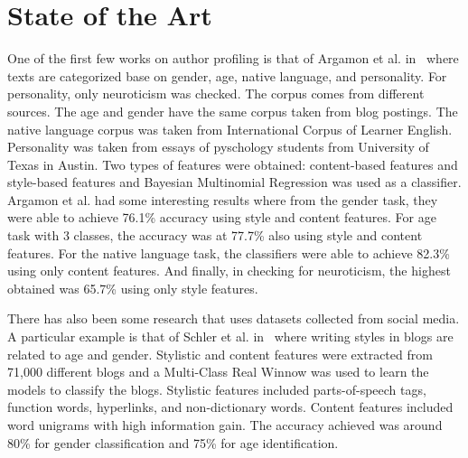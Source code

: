 \documentclass[a4paper]{llncs}
\begin{document}
\section{State of the Art}
One of the first few works on author profiling is that of Argamon et al. in~\cite{argamon2009automatically} where texts are categorized base on gender, age, native language, and personality. For personality, only neuroticism was checked. The corpus comes from different sources. The age and gender have the same corpus taken from blog postings. The native language corpus was taken from International Corpus of Learner English. Personality was taken from essays of pyschology students from University of Texas in Austin. Two types of features were obtained: content-based features and style-based features and Bayesian Multinomial Regression was used as a classifier. Argamon et al. had some interesting results where from the gender task, they were able to achieve 76.1\% accuracy using style and content features. For age task with 3 classes, the accuracy was at 77.7\% also using style and content features. For the native language task, the classifiers were able to achieve 82.3\% using only content features. And finally, in checking for neuroticism, the highest obtained was 65.7\% using only style features. 

There has also been some research that uses datasets collected from social media. A particular example is that of Schler et al. in~\cite{schler2006effects} where writing styles in blogs are related to age and gender. Stylistic and content features were extracted from 71,000 different blogs and a Multi-Class Real Winnow was used to learn the models to classify the blogs. Stylistic features included parts-of-speech tags, function words, hyperlinks, and non-dictionary words. Content features included word unigrams with high information gain. The accuracy achieved was around 80\% for gender classification and 75\% for age identification.  
\end{document}
